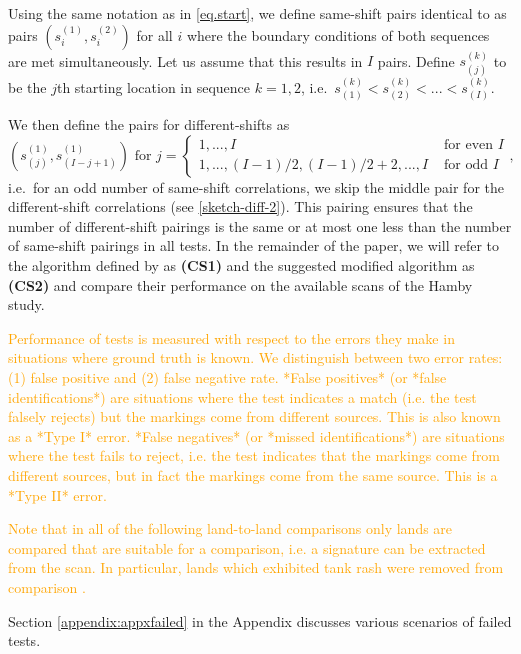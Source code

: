 \documentclass[12pt]{article}
\begin{document}
Using the same notation as in \autoref{eq.start}, we define same-shift
pairs identical to \citet{hadler} as pairs \((s_i^{(1)}, s_i^{(2)})\)
for all \(i\) where the boundary conditions of both sequences are met
simultaneously. Let us assume that this results in \(I\) pairs. Define
\(s_{(j)}^{(k)}\) to be the \(j\)th starting location in sequence
\(k = 1, 2\),
i.e.~\(s_{(1)}^{(k)} < s_{(2)}^{(k)} < ... < s_{(I)}^{(k)}\).

We then define the pairs for different-shifts as
\begin{equation}\label{eq.diff2}
\left(s_{(j)}^{(1)}, s_{(I-j+1)}^{(1)} \right) \text{ for } j = 
\begin{cases}
1, ..., I & \text{ for even } I \\
1, ..., (I-1)/2, (I-1)/2 + 2, ..., I & \text{ for odd } I
\end{cases},
\end{equation} i.e.~for an odd number of same-shift correlations, we
skip the middle pair for the different-shift correlations (see
\autoref{sketch-diff-2}). This pairing ensures that the number of
different-shift pairings is the same or at most one less than the number
of same-shift pairings in all tests. In the remainder of the paper, we
will refer to the algorithm defined by \citet{hadler} as \textbf{(CS1)}
and the suggested modified algorithm as \textbf{(CS2)} and compare their
performance on the available scans of the Hamby study.

{\textcolor{orange}{Performance of tests is measured with respect to the errors they make in situations where ground truth is known. We distinguish between two error rates: (1) false positive and (2) false negative rate.
*False positives* (or *false identifications*) are situations where the test indicates a match (i.e. the test falsely rejects) but the markings come from different sources. This is also known as a *Type I* error. 
*False negatives* (or *missed identifications*) are situations where the test fails to reject, i.e. the test indicates that the markings come from different sources, but in fact the markings come from the same source. This is a *Type II* error.}}

{\textcolor{orange}{Note that in all of the following land-to-land comparisons only lands are compared that are suitable for a comparison, i.e. a signature can be extracted from the scan. In particular, lands which exhibited tank rash  were removed from comparison \citep{aoas}.
}}

Section \ref{appendix:appxfailed} in the Appendix discusses various
scenarios of failed tests.
\end{document}
